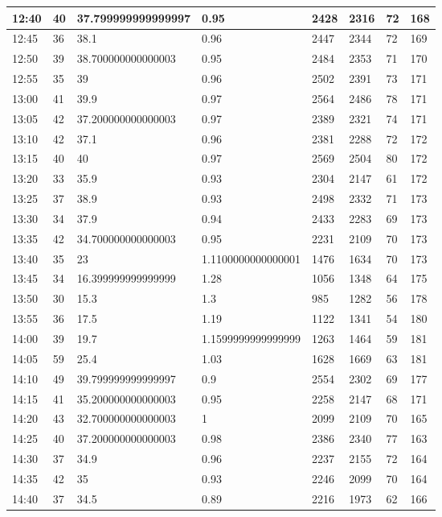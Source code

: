 \documentclass[
]{book}
\begin{document}
\begin{tabular}{l|l|l|l|l|l|l|l}
\hline
12:40 & 40 & 37.799999999999997 & 0.95 & 2428 & 2316 & 72 & 168\\
\hline
12:45 & 36 & 38.1 & 0.96 & 2447 & 2344 & 72 & 169\\
\hline
12:50 & 39 & 38.700000000000003 & 0.95 & 2484 & 2353 & 71 & 170\\
\hline
12:55 & 35 & 39 & 0.96 & 2502 & 2391 & 73 & 171\\
\hline
13:00 & 41 & 39.9 & 0.97 & 2564 & 2486 & 78 & 171\\
\hline
13:05 & 42 & 37.200000000000003 & 0.97 & 2389 & 2321 & 74 & 171\\
\hline
13:10 & 42 & 37.1 & 0.96 & 2381 & 2288 & 72 & 172\\
\hline
13:15 & 40 & 40 & 0.97 & 2569 & 2504 & 80 & 172\\
\hline
13:20 & 33 & 35.9 & 0.93 & 2304 & 2147 & 61 & 172\\
\hline
13:25 & 37 & 38.9 & 0.93 & 2498 & 2332 & 71 & 173\\
\hline
13:30 & 34 & 37.9 & 0.94 & 2433 & 2283 & 69 & 173\\
\hline
13:35 & 42 & 34.700000000000003 & 0.95 & 2231 & 2109 & 70 & 173\\
\hline
13:40 & 35 & 23 & 1.1100000000000001 & 1476 & 1634 & 70 & 173\\
\hline
13:45 & 34 & 16.399999999999999 & 1.28 & 1056 & 1348 & 64 & 175\\
\hline
13:50 & 30 & 15.3 & 1.3 & 985 & 1282 & 56 & 178\\
\hline
13:55 & 36 & 17.5 & 1.19 & 1122 & 1341 & 54 & 180\\
\hline
14:00 & 39 & 19.7 & 1.1599999999999999 & 1263 & 1464 & 59 & 181\\
\hline
14:05 & 59 & 25.4 & 1.03 & 1628 & 1669 & 63 & 181\\
\hline
14:10 & 49 & 39.799999999999997 & 0.9 & 2554 & 2302 & 69 & 177\\
\hline
14:15 & 41 & 35.200000000000003 & 0.95 & 2258 & 2147 & 68 & 171\\
\hline
14:20 & 43 & 32.700000000000003 & 1 & 2099 & 2109 & 70 & 165\\
\hline
14:25 & 40 & 37.200000000000003 & 0.98 & 2386 & 2340 & 77 & 163\\
\hline
14:30 & 37 & 34.9 & 0.96 & 2237 & 2155 & 72 & 164\\
\hline
14:35 & 42 & 35 & 0.93 & 2246 & 2099 & 70 & 164\\
\hline
14:40 & 37 & 34.5 & 0.89 & 2216 & 1973 & 62 & 166\\

\end{tabular}
\end{document}
